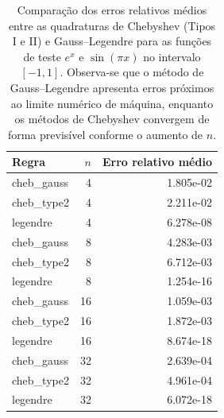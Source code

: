\begin{table}[H]
\centering
\caption{Comparação dos erros relativos médios entre as quadraturas de Chebyshev (Tipos I e II) e Gauss–Legendre para as funções de teste \(e^x\) e \(\sin(\pi x)\) no intervalo \([-1,1]\). Observa-se que o método de Gauss–Legendre apresenta erros próximos ao limite numérico de máquina, enquanto os métodos de Chebyshev convergem de forma previsível conforme o aumento de \(n\).}
\label{tab:cheb_vs_legendre_errors}
\begin{tabular}{lrr}
\toprule
     Regra &  $n$ &  Erro relativo médio \\
\midrule
cheb\_gauss &    4 &            1.805e-02 \\
cheb\_type2 &    4 &            2.211e-02 \\
  legendre &    4 &            6.278e-08 \\
cheb\_gauss &    8 &            4.283e-03 \\
cheb\_type2 &    8 &            6.712e-03 \\
  legendre &    8 &            1.254e-16 \\
cheb\_gauss &   16 &            1.059e-03 \\
cheb\_type2 &   16 &            1.872e-03 \\
  legendre &   16 &            8.674e-18 \\
cheb\_gauss &   32 &            2.639e-04 \\
cheb\_type2 &   32 &            4.961e-04 \\
  legendre &   32 &            6.072e-18 \\
\bottomrule
\end{tabular}
\end{table}
